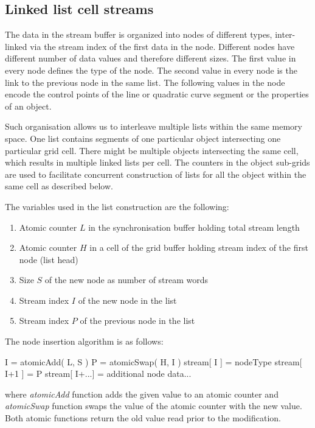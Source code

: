 \documentclass[11pt,a4paper,twoside]{article}
\begin{document}
\subsection {Linked list cell streams}

The data in the stream buffer is organized into nodes of different types, inter-linked via the stream index of the first data in the node. Different nodes have different number of data values and therefore different sizes. The first value in every node defines the type of the node. The second value in every node is the link to the previous node in the same list. The following values in the node encode the control points of the line or quadratic curve segment or the properties of an object.

Such organisation allows us to interleave multiple lists within the same memory space. One list contains segments of one particular object intersecting one particular grid cell. There might be multiple objects intersecting the same cell, which results in multiple linked lists per cell. The counters in the object sub-grids are used to facilitate concurrent construction of lists for all the object within the same cell as described below.

The variables used in the list construction are the following:

\begin {enumerate}
\item
Atomic counter $L$ in the synchronisation buffer holding total stream length
\item
Atomic counter $H$ in a cell of the grid buffer holding stream index of the first node (list head)
\item
Size $S$ of the new node as number of stream words
\item
Stream index $I$ of the new node in the list
\item
Stream index $P$ of the previous node in the list
\end {enumerate}

The node insertion algorithm is as follows:
\begin{verbatimtab}[3]
	I = atomicAdd( L, S )
	P = atomicSwap( H, I )
	stream[ I ] = nodeType
	stream[ I+1 ] = P
	stream[ I+...] = additional node data...
\end{verbatimtab}

where \emph{atomicAdd} function adds the given value to an atomic counter and \emph{atomicSwap} function swaps the value of the atomic counter with the new value. Both atomic functions return the old value read prior to the modification.
\end{document}
